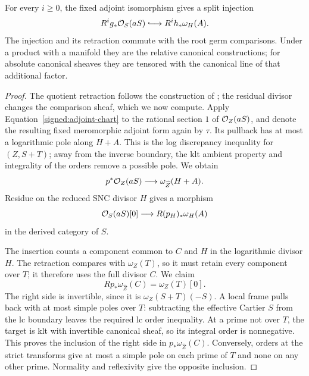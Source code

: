 \begin{lemma}\label{signed:residue}
For every \(i\geq0\), the fixed adjoint isomorphism gives a
split injection
\begin{equation}\label{signed:residue-injection}
 R^ig_*\OO_S(aS)\lhook\joinrel\longrightarrow
 R^ih_*\omega_H(A).
\end{equation}
The injection and its retraction commute with the root germ
comparisons.  Under a product with a manifold they are the
relative canonical constructions; for absolute canonical
sheaves they are tensored with the canonical line of that
additional factor.
\end{lemma}

\begin{proof}
The quotient retraction follows the construction of
\cite[Proposition~10.4]{BL}; the residual divisor changes
the comparison sheaf, which we now compute.
Apply Equation~\eqref{signed:adjoint-chart} to the rational
section \(1\) of \(\mathcal O_Z(aS)\), and denote the resulting
fixed meromorphic adjoint form again by \(\tau\).  Its pullback has at
most a logarithmic pole along \(H+A\).  This is the log
discrepancy inequality for \((Z,S+T)\); away from the inverse
boundary, the klt ambient property and integrality of the
orders remove a possible pole.  We obtain
\[
 p^*\mathcal O_Z(aS)\longrightarrow\omega_{\widehat Z}(H+A).
\]
Residue on the reduced SNC divisor \(H\) gives a morphism
\begin{equation}\label{signed:derived-insertion}
 \mathcal O_S(aS)[0]\longrightarrow R(p_H)_*\omega_H(A)
\end{equation}
in the derived category of \(S\).

The insertion counts a component common to \(C\) and \(H\) in the
logarithmic divisor \(H\).  The retraction compares with \(\omega_Z(T)\),
so it must retain every component over \(T\); it therefore uses the full
divisor \(C\).  We claim
\begin{equation}\label{signed:full-residual-comparison}
 Rp_*\omega_{\widehat Z}(C)=\omega_Z(T)[0].
\end{equation}
The right side is invertible, since it is
\(\omega_Z(S+T)(-S)\).  A local frame pulls back with at
most simple poles over \(T\): subtracting the effective
Cartier \(S\) from the lc boundary leaves the required lc
order inequality.  At a prime not over \(T\), the target is
klt with invertible canonical sheaf, so its integral order is
nonnegative.  This proves the inclusion of the right side in
\(p_*\omega_{\widehat Z}(C)\).  Conversely, orders at the
strict transforms give at most a simple pole on each prime of
\(T\) and none on any other prime.  Normality and reflexivity
give the opposite inclusion.


\end{proof}
